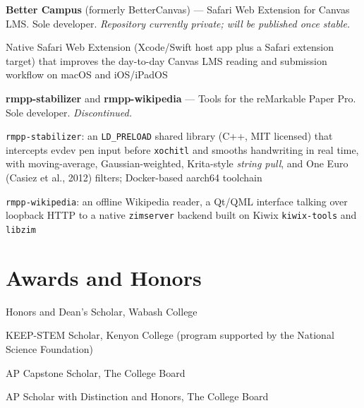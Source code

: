 \documentclass[11pt,letterpaper]{report} %
\newcommand{\listitemspace}{0.25em}
\renewenvironment{itemize}
{\begin{list}{}{\setlength{\leftmargin}{0em}
                \setlength{\parskip}{0em}
                \setlength{\itemsep}{\listitemspace}
                \setlength{\parsep}{\listitemspace}}}
{\end{list}}
\begin{document}
    \begin{tablist}
        \item[2024--]   \tab{}\textbf{Better Campus} (formerly BetterCanvas) --- Safari Web Extension for Canvas LMS. Sole developer. \textit{Repository currently private; will be published once stable.}
    \end{tablist}
    \begin{itemize}
        \item Native Safari Web Extension (Xcode/Swift host app plus a Safari extension target) that improves the day-to-day Canvas LMS reading and submission workflow on macOS and iOS/iPadOS
    \end{itemize}

    \begin{tablist}
        \item[2025--26] \tab{}\textbf{rmpp-stabilizer} and \textbf{rmpp-wikipedia} --- Tools for the reMarkable Paper Pro. Sole developer. \textit{Discontinued.}
    \end{tablist}
    \begin{itemize}
        \item \texttt{rmpp-stabilizer}: an \texttt{LD\_PRELOAD} shared library (C++, MIT licensed) that intercepts evdev pen input before \texttt{xochitl} and smooths handwriting in real time, with moving-average, Gaussian-weighted, Krita-style \textit{string pull}, and One Euro (Casiez et al., 2012) filters; Docker-based aarch64 toolchain
        \item \texttt{rmpp-wikipedia}: an offline Wikipedia reader, a Qt/QML interface talking over loopback HTTP to a native \texttt{zimserver} backend built on Kiwix \texttt{kiwix-tools} and \texttt{libzim}
    \end{itemize}

    \section*{Awards and Honors}
    \begin{tablist}
        \item[2025] \tab{}Honors and Dean's Scholar, Wabash College
        \item[2023] \tab{}KEEP-STEM Scholar, Kenyon College (program supported by the National Science Foundation)
        \item[2022] \tab{}AP Capstone Scholar, The College Board
        \item[2021] \tab{}AP Scholar with Distinction and Honors, The College Board
    \end{tablist}
\end{document}
